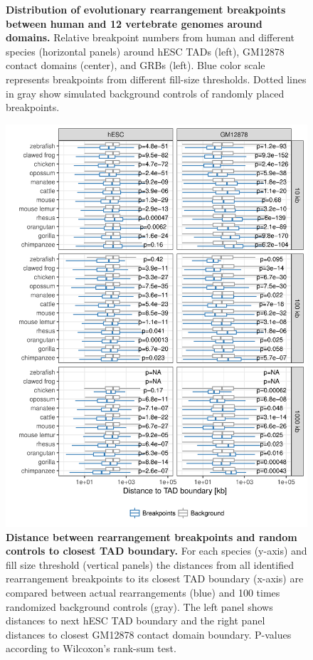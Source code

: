 \documentclass[a4paper,twoside=true,openright,parskip=full,chapterprefix=true,11pt,headings=normal,bibliography=totoc,listof=totoc,titlepage=on,captions=tableabove,draft=false]{scrreprt}
\theoremstyle{definition}
\theoremstyle{definition}
\theoremstyle{definition}
\theoremstyle{remark}
\begin{document}
\begin{figure}
{}

\caption{\textbf{Distribution of evolutionary rearrangement
breakpoints between human and 12 vertebrate genomes around domains.}
Relative breakpoint numbers from human and different species (horizontal
panels) around hESC TADs (left), GM12878 contact domains (center), and
GRBs (left). Blue color scale represents breakpoints from different
fill-size thresholds. Dotted lines in gray show simulated background
controls of randomly placed breakpoints.}\label{fig:TadEvoS1}
\end{figure}









\begin{figure}

{\centering \includegraphics[width=0.8\linewidth]{figures/TAD_evolution/fig_S2_v01} 

}

\caption{\textbf{Distance between rearrangement breakpoints and
random controls to closest TAD boundary.} For each species (y-axis) and
fill size threshold (vertical panels) the distances from all identified
rearrangement breakpoints to its closest TAD boundary (x-axis) are
compared between actual rearrangements (blue) and 100 times randomized
background controls (gray). The left panel shows distances to next hESC
TAD boundary and the right panel distances to closest GM12878 contact
domain boundary. P-values according to Wilcoxon's rank-sum test.}\label{fig:TadEvoS2}
\end{figure}
\end{document}
